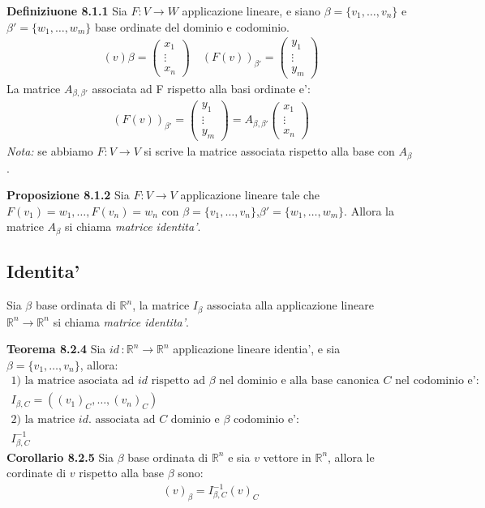 \documentclass{article}
\begin{document}
\textbf{Definiziuone 8.1.1}
Sia $F : V \to W$ applicazione lineare, e siano $\beta=\{v_1,\dots,v_n\}$ e $\beta'=\{w_1,\dots,w_m\}$ base ordinate del dominio e codominio.
\begin{align*}
  (v)\beta=\begin{pmatrix}
    x_1 \\
    \vdots \\
    x_n
  \end{pmatrix}
  \quad
  (F(v))_{\beta'}=\begin{pmatrix}
    y_1 \\
    \vdots \\
    y_m
  \end{pmatrix}
\end{align*}
La matrice $A_{\beta,\beta'}$ associata ad F rispetto alla basi ordinate e':
\begin{align*}
  (F(v))_{\beta'}=\begin{pmatrix}
    y_1 \\
    \vdots \\
    y_m
  \end{pmatrix} = A_{\beta,\beta'}\begin{pmatrix}
    x_1 \\
    \vdots \\
    x_n
  \end{pmatrix}
\end{align*}
\textit{Nota: } se abbiamo $F : V \to V$ si scrive la matrice associata rispetto alla base con $A_\beta$.

\textbf{Proposizione 8.1.2}
Sia $F : V \to V$ applicazione lineare tale che $F(v_1)=w_1, \dots,F(v_n)=w_n$ con $\beta=\{v_1,\dots,v_n\}$,$\beta'=\{w_1,\dots,w_m\}$. Allora la matrice $A_\beta$ si chiama \textit{matrice identita'}.

\subsection{Identita'}
Sia $\beta$ base ordinata di $\mathbb{R}^n$, la matrice $I_\beta$  associata alla applicazione lineare $\mathbb{R}^n \to \mathbb{R}^n$ si chiama \textit{matrice identita'}.

\textbf{Teorema 8.2.4}
Sia $id \, : \mathbb{R}^n \to \mathbb{R}^n$ applicazione lineare identia', e sia $\beta=\{v_1,\dots,v_n\}$, allora:
\begin{align*}
  \text{1) la matrice asociata ad $id$ rispetto ad $\beta$ nel dominio e alla base canonica $C$ nel codominio e': } \\
  I_{\beta,C}=((v_1)_C,\dots,(v_n)_C) \\
  \text{2)  la matrice $id.$ associata ad $C$ dominio e $\beta$ codominio e': }\\
  I_{\beta,C}^{-1}
\end{align*}
\textbf{Corollario 8.2.5}
Sia $\beta$ base ordinata di $\mathbb{R}^n$ e sia $v$ vettore in $\mathbb{R}^n$, allora le cordinate di $v$ rispetto alla base $\beta$ sono:
\begin{align*}
  (v)_\beta=I_{\beta,C}^{-1}(v)_C
\end{align*}
\end{document}
